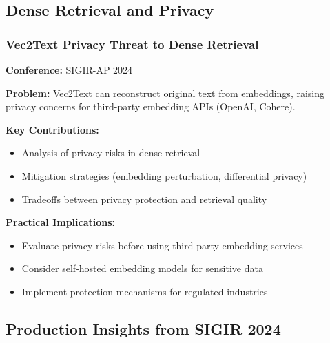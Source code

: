 \documentclass[11pt,letterpaper]{article}
\begin{document}
\subsection{Dense Retrieval and Privacy}

\subsubsection{Vec2Text Privacy Threat to Dense Retrieval}
\textbf{Conference:} SIGIR-AP 2024

\textbf{Problem:} Vec2Text can reconstruct original text from embeddings, raising privacy concerns for third-party embedding APIs (OpenAI, Cohere).

\textbf{Key Contributions:}
\begin{itemize}[leftmargin=*]
    \item Analysis of privacy risks in dense retrieval
    \item Mitigation strategies (embedding perturbation, differential privacy)
    \item Tradeoffs between privacy protection and retrieval quality
\end{itemize}

\textbf{Practical Implications:}
\begin{itemize}[leftmargin=*]
    \item Evaluate privacy risks before using third-party embedding services
    \item Consider self-hosted embedding models for sensitive data
    \item Implement protection mechanisms for regulated industries
\end{itemize}

\subsection{Production Insights from SIGIR 2024}
\end{document}
